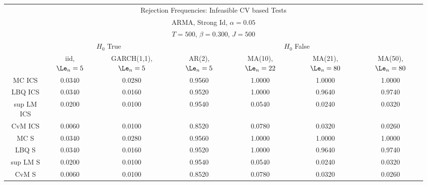  \begin{table}[H] 
 \tiny 
 \centering 
\begin{tabular}{|c|c|c||c|c|c|c|} 
\multicolumn{7}{c}{ Rejection Frequencies: Infeasible CV based Tests } \\ 
\multicolumn{7}{c}{ ARMA, Strong Id, $\alpha = 0.05$ } \\ 
\multicolumn{7}{c}{ $T=500$, $\beta = 0.300$, $J=500$ } \\ 
  \multicolumn{1}{c}{ } & \multicolumn{2}{c}{ $H_{0}$ True} & \multicolumn{4}{c}{ $H_{0}$ False} \\ 
 \hline 
 & iid, $\Le_n=5$ & GARCH(1,1), $\Le_n=5$ & AR(2), $\Le_n=5$ & MA(10), $\Le_n=22$ & MA(21), $\Le_n=80$ & MA(50), $\Le_n=80$   \\ 
 \hline 
 MC ICS &  0.0340 &  0.0280 &  0.9560 &  1.0000 &  1.0000 &  1.0000 \\ 
 LBQ ICS &  0.0340 &  0.0160 &  0.9520 &  1.0000 &  0.9640 &  0.9740 \\ 
 sup LM ICS &  0.0200 &  0.0100 &  0.9540 &  0.0540 &  0.0240 &  0.0320 \\ 
 CvM ICS &  0.0060 &  0.0100 &  0.8520 &  0.0780 &  0.0320 &  0.0260 \\ 
 \hline 
 MC S &  0.0340 &  0.0280 &  0.9560 &  1.0000 &  1.0000 &  1.0000 \\ 
 LBQ S &  0.0340 &  0.0160 &  0.9520 &  1.0000 &  0.9640 &  0.9740 \\ 
 sup LM S &  0.0200 &  0.0100 &  0.9540 &  0.0540 &  0.0240 &  0.0320 \\ 
 CvM S &  0.0060 &  0.0100 &  0.8520 &  0.0780 &  0.0320 &  0.0260 \\ 
 \hline 
\end{tabular}
 \end{table}
